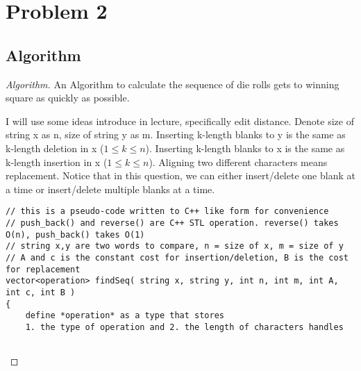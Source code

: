 \documentclass[openany]{article}
\begin{document}
\section*{Problem 2}

\subsection*{Algorithm}
\begin{proof}[Algorithm]{}
	An Algorithm to calculate the sequence of die rolls gets to winning square as quickly as possible.

I will use some ideas introduce in lecture, specifically edit distance. Denote size of string x as n, size of string y as m. Inserting k-length blanks to y is the same as k-length deletion in x ($1 \leq k \leq n $). Inserting k-length blanks to x is the same as k-length insertion in x ($1 \leq k \leq n $). Aligning two different characters means replacement. Notice that in this question, we can either insert/delete one blank at a time or insert/delete multiple blanks at a time.
		\renewcommand{\qedsymbol}{}
	
		\begin{lstlisting}[basicstyle=\fontsize{8}{9}\selectfont\ttfamily]
// this is a pseudo-code written to C++ like form for convenience
// push_back() and reverse() are C++ STL operation. reverse() takes O(n), push_back() takes O(1)
// string x,y are two words to compare, n = size of x, m = size of y
// A and c is the constant cost for insertion/deletion, B is the cost for replacement
vector<operation> findSeq( string x, string y, int n, int m, int A, int c, int B )
{
    define *operation* as a type that stores
    1. the type of operation and 2. the length of characters handles
    

\end{lstlisting}
\end{proof}
\end{document}
